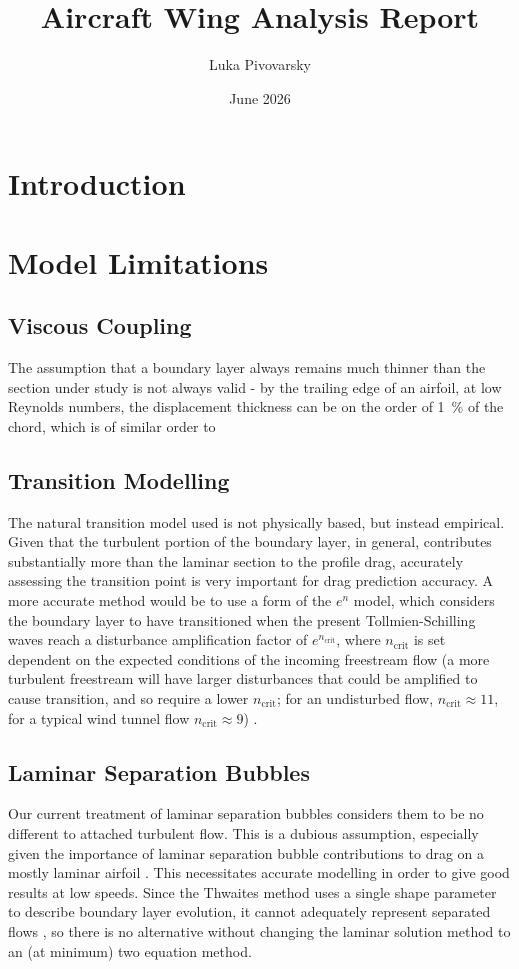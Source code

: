 \documentclass[12pt]{article}
\title{Aircraft Wing Analysis Report}
\author{Luka Pivovarsky}
\date{June 2026}
\begin{document}

\setcounter{page}{1}
\maketitle

\section{Introduction}
\section{Model Limitations} \label{sec:limitations}

\subsection{Viscous Coupling}
The assumption that a boundary layer always remains much thinner than the section under study is not always valid - by the trailing edge of an airfoil, at low Reynolds numbers, the displacement thickness can be on the order of \qty{1}{\percent} of the chord, which is of similar order to 
\subsection{Transition Modelling}
The natural transition model used is not physically based, but instead empirical. Given that the turbulent portion of the boundary layer, in general, contributes substantially more than the laminar section to the profile drag, accurately assessing the transition point is very important for drag prediction accuracy. A more accurate method would be to use a form of the $e^n$ model, which considers the boundary layer to have transitioned when the present Tollmien-Schilling waves reach a disturbance amplification factor of $e^{n_\mathrm{crit}}$, where $n_\mathrm{crit}$ is set dependent on the expected conditions of the incoming freestream flow (a more turbulent freestream will have larger disturbances that could be amplified to cause transition, and so require a lower $n_\mathrm{crit}$; for an undisturbed flow, $n_\mathrm{crit} \approx 11$, for a typical wind tunnel flow $n_\mathrm{crit} \approx 9$) \cite{boundarylayersyoung}. 
\subsection{Laminar Separation Bubbles}
Our current treatment of laminar separation bubbles considers them to be no different to attached turbulent flow. This is a dubious assumption, especially given the importance of laminar separation bubble contributions to drag on a mostly laminar airfoil \cite{lowspeeddesign}. This necessitates accurate modelling in order to give good results at low speeds. Since the Thwaites method uses a single shape parameter to describe boundary layer evolution, it cannot adequately represent separated flows \cite{oneparameterbad}, so there is no alternative without changing the laminar solution method to an (at minimum) two equation method.
\end{document}
